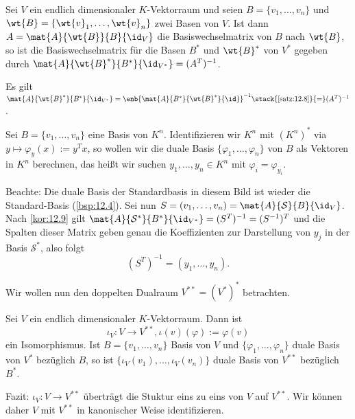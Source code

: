 \begin{korollar}
	\label{kor:12.9}
	Sei $V$ ein endlich dimensionaler $K$-Vektorraum und seien $B = \{v_1,\dots,v_n\}$ und $\wt{B} = \{\wt{v}_1,\dots,\wt{v}_n\}$ zwei Basen von $V$.
	Ist dann $A = \mat{A}{\wt{B}}{B}{\id_V}$ die Basiswechselmatrix von $B$ nach $\wt{B}$, so ist die Basiswechselmatrix für die Basen $B^*$ und $\wt{B}^*$ von $V^*$ gegeben durch $\mat{A}{\wt{B}^*}{B^*}{\id_{V^*}} = (A^T)^{-1}$.
\end{korollar}

\begin{beweis}
	Es gilt $\mat{A}{\wt{B}^*}{B^*}{\id_{V^*}} = \enb{\mat{A}{B^*}{\wt{B}^*}{\id}}^{-1} \stack{\ref{satz:12.8}}{=} (A^T)^{-1}$. 
\end{beweis}

\begin{anwendung}
	\label{anw:12.10}
	Sei $B = \{v_1,\dots,v_n\}$ eine Basis von $K^n$.
	Identifizieren wir $K^n$ mit $(K^n)^*$ via $y \mapsto \varphi_y(x) := y^Tx$, so wollen wir die duale Basis $\{\varphi_1,\dots,\varphi_n\}$ von $B$ als Vektoren in $K^n$ berechnen, das heißt wir suchen $y_1,\dots,y_n \in K^n$ mit $\varphi_i = \varphi_{y_i}$.
	
	Beachte: Die duale Basis der Standardbasis in diesem Bild ist wieder die Standard-Basis (\autoref{bsp:12.4}).
	Sei nun $S = (v_1,\dots,v_n) = \mat{A}{\mathcal{S}}{B}{\id_V}$.
	Nach \autoref{kor:12.9} gilt $\mat{A}{\mathcal{S}^*}{B^*}{\id_{V^*}} = (S^T)^{-1} = (S^{-1})^T$ und die Spalten dieser Matrix geben genau die Koeffizienten zur Darstellung von $y_j$ in der Basis $\mathcal{S}^*$, also folgt
	\[
		(S^T)^{-1} = (y_1,\dots,y_n).
	\]
\end{anwendung}

Wir wollen nun den doppelten Dualraum $V^{**} = (V^*)^*$ betrachten.

\begin{satz}
	\label{satz:12.11}
	Sei $V$ ein endlich dimensionaler $K$-Vektorraum.
	Dann ist
	\[
		\iota_V \colon V \rightarrow V^{**}, \iota(v)(\varphi) := \varphi(v)
	\]
	ein Isomorphismus.
	Ist $B = \{v_1,\dots,v_n\}$ Basis von $V$ und $\{\varphi_1,\dots,\varphi_n\}$ duale Basis von $V^*$ bezüglich $B$, so ist $\{\iota_V(v_1),\dots,\iota_V(v_n)\}$ duale Basis von $V^{**}$ bezüglich $B^*$.
\end{satz}
\newpage
Fazit: $\iota_V \colon V \rightarrow V^{**}$ überträgt die Stuktur eins zu eins von $V$ auf $V^{**}$.
Wir können daher $V$ mit $V^{**}$ in kanonischer Weise identifizieren.

